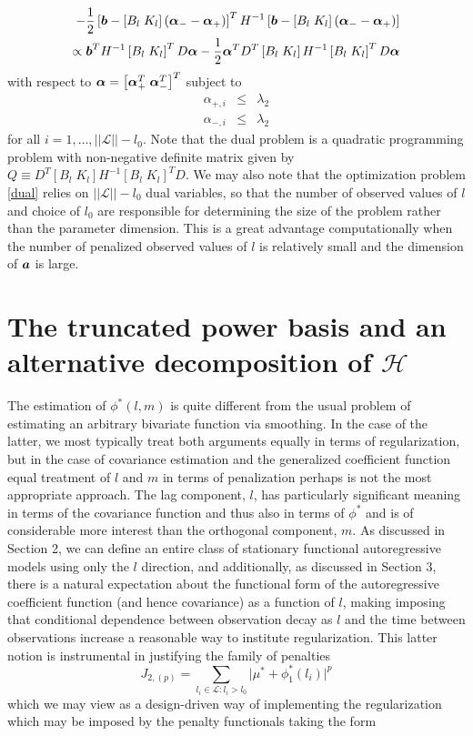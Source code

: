 \documentclass[12pt]{article}
\newcommand{\bfalpha}{\mbox{\boldmath $\alpha$}}
\newcommand{\bfa}{\mbox{\boldmath $a$}}
\newcommand{\bfb}{\mbox{\boldmath $b$}}
\theoremstyle{definition}
\begin{document}
\begin{eqnarray}
  -\frac{1}{2}\left[ \bfb - \left[B_l\;K_l\right]\left(\bfalpha_- -\bfalpha_+  \right) \right]^T H^{-1} \left[ \bfb - \left[B_l\;K_l\right]\left(\bfalpha_- -\bfalpha_+  \right) \right] \\
  \propto  \bfb^T H^{-1}\left[B_l\;K_l \right]^TD \bfalpha - \frac{1}{2}\bfalpha^TD^T \left[B_l\;K_l \right]  H^{-1}\left[B_l\;K_l \right]^TD\bfalpha \label{dual}
\end{eqnarray} \noindent
with respect to $\bfalpha = \left[ \bfalpha_+^T\;\bfalpha_-^T \right]^T$ subject to
\begin{eqnarray}
\alpha_{+,i} &\le& \lambda_2\\
\alpha_{-,i} &\le& \lambda_2
\end{eqnarray}
\noindent
for all $i = 1,\dots, \vert \vert \mathcal{L}\vert \vert - l_0$. Note that the dual problem is a quadratic programming problem with non-negative definite matrix given by $Q \equiv D^T \left[B_l\;K_l \right]  H^{-1}\left[B_l\;K_l \right]^TD$. We may also note that the optimization problem \eqref{dual} relies on $\vert \vert \mathcal{L}\vert \vert - l_0$ dual variables, so that the number of observed values of $l$ and choice of $l_0$ are responsible for determining the size of the problem rather than the parameter dimension. This is a great advantage computationally when the number of penalized observed values of $l$ is relatively small and the dimension of $\bfa$ is large. 

\section{The truncated power basis and an alternative decomposition of $\mathcal{H}$}

The estimation of $\phi^*\left(l,m\right)$ is quite different from the usual problem of estimating an arbitrary bivariate function via smoothing. In the case of the latter, we most typically treat both arguments equally in terms of regularization, but in the case of covariance estimation and the generalized coefficient function equal treatment of $l$ and $m$ in terms of penalization perhaps is not the most appropriate approach. The lag component, $l$, has particularly significant meaning in terms of the covariance function and thus also in terms of $\phi^*$ and is of considerable more interest than the orthogonal component, $m$. As discussed in Section 2, we can define an entire class of stationary functional autoregressive models using only the $l$ direction, and additionally, as discussed in Section 3, there is a natural expectation about the functional form of the autoregressive coefficient function (and hence covariance) as a function of $l$, making imposing that conditional dependence between observation decay as $l$ and the time between observations increase a reasonable way to institute regularization.
This latter notion is instrumental in justifying the family of penalties
\[
J_{2,\left(p\right)} = \sum_{  l_i \in \mathcal{L}: l_i > l_0} \vert \mu^* + \phi^*_1\left(l_i\right) \vert^p 
\]
\noindent
which we may view as a design-driven way of implementing the regularization which may be imposed by the penalty functionals taking the form
\end{document}
